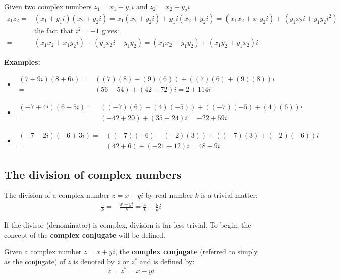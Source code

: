 \documentclass{article}
\begin{document}
Given two complex numbers \(z_1 = x_1 + y_1 i\) and \(z_2 = x_2 + y_2 i\)
\begin{align*}
z_1z_2 = & (x_1 + y_1 i)(x_2 + y_2 i) 
= x_1(x_2 + y_2 i) + y_1 i (x_2 + y_2 i)
= (x_1 x_2 + x_1 y_2 i) + (y_1 x_2 i + y_1 y_2 i^2) \\
& \text{the fact that } i^2 = -1 \text{ gives:} \\
= & (x_1 x_2 + x_1 y_2 i) + (y_1 x_2 i - y_1 y_2) 
= (x_1 x_2 - y_1 y_2) + (x_1 y_2 + y_1 x_2)i
\end{align*}

\textbf{Examples:}
\begin{itemize}
\item 
\begin{align*}
(7 + 9i)(8 + 6i) = & ((7)(8) - (9)(6)) + ((7)(6) + (9)(8))i \\
= & (56 - 54) + (42 + 72)i 
= 2 + 114i
\end{align*}
\item 
\begin{align*}
(-7 + 4i)(6 - 5i) = & ((-7)(6) - (4)(-5)) + ((-7)(-5) + (4)(6))i \\
= & (-42 + 20) + (35 + 24)i 
= -22 + 59i
\end{align*}
\item 
\begin{align*}
(-7 - 2i)(-6 + 3i) = & ((-7)(-6) - (-2)(3)) + ((-7)(3) + (-2)(-6))i \\
= & (42 + 6) + (-21 + 12)i 
= 48 - 9i
\end{align*}
\end{itemize}



\subsection*{The division of complex numbers}

The division of a complex number \(z = x + y i\) by real number \(k\) is a trivial matter:
\begin{align*}
\frac{z}{k} = & \frac{x + y i}{k} 
= \frac{x}{k} + \frac{y}{k} i
\end{align*}

If the divisor (denominator) is complex, division is far less trivial. To begin, the concept of the {\bf complex conjugate} will be defined. 

Given a complex number \(z = x + yi\), the {\bf complex conjugate} (referred to simply as the conjugate) of \(z\) is denoted by \(\bar{z}\) or \(z^*\) and is defined by:
\[\bar{z} = z^* = x - y i\] 
\end{document}
